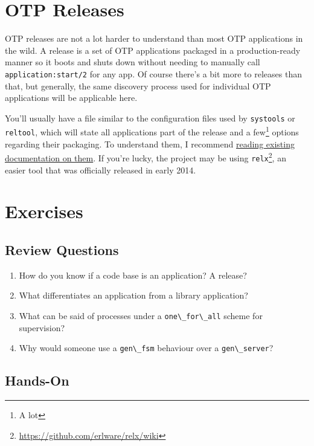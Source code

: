 \documentclass[11pt, oneside]{book}   	%
\newcommand{\app}[1]{\Verb`#1`}
\newcommand{\module}[1]{\Verb`#1`}
\newcommand{\function}[1]{\Verb`#1`}
\newcommand{\term}[1]{\Verb`#1`}
\begin{document}
\FloatBarrier

\section{OTP Releases}
\label{sec:dive-otp-releases}

OTP releases are not a lot harder to understand than most OTP applications in the wild. A release is a set of OTP applications packaged in a production-ready manner so it boots and shuts down without needing to manually call \function{application:start/2} for any app. Of course there's a bit more to releases than that, but generally, the same discovery process used for individual OTP applications will be applicable here.

You'll usually have a file similar to the configuration files used by \module{systools} or \module{reltool}, which will state all applications part of the release and a few\footnote{A lot} options regarding their packaging. To understand them, I recommend \href{http://learnyousomeerlang.com/release-is-the-word}{reading existing documentation on them}. If you're lucky, the project may be using \app{relx}\footnote{\href{https://github.com/erlware/relx/wiki}{https://github.com/erlware/relx/wiki}}, an easier tool that was officially released in early 2014.


\section{Exercises}

\subsection{Review Questions}

\begin{enumerate}
	\item How do you know if a code base is an application? A release?
	\item What differentiates an application from a library application?
	\item What can be said of processes under a \term{one\_for\_all} scheme for supervision?
	\item Why would someone use a \module{gen\_fsm} behaviour over a \module{gen\_server}?
\end{enumerate}

\subsection{Hands-On}
\end{document}
